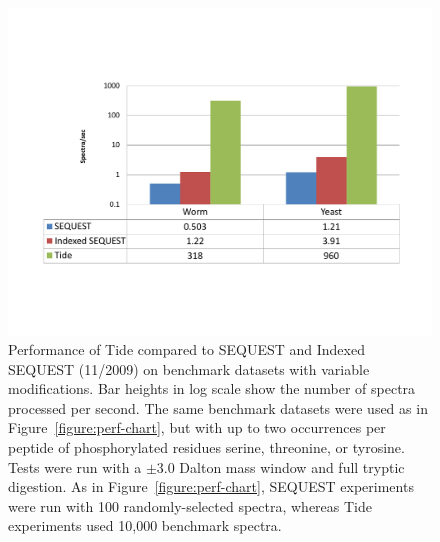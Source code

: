 \begin{figure}
\centering
\includegraphics[width=6.5in]{timing_chart_mods-cropped.pdf}
\caption[Performance of Tide compared to SEQUEST and Indexed SEQUEST on
  benchmark datasets with variable modifications]{Performance of Tide compared
  to SEQUEST and Indexed SEQUEST (11/2009) on benchmark datasets with variable
  modifications. Bar heights in log scale show the number of spectra processed
  per second.  The same benchmark datasets were used as in
  Figure~\ref{figure:perf-chart}, but with up to two occurrences per peptide of
  phosphorylated residues serine, threonine, or tyrosine. Tests were run with a
  $\pm3.0$ Dalton mass window and full tryptic digestion. As in
  Figure~\ref{figure:perf-chart}, SEQUEST experiments were run with 100
  randomly-selected spectra, whereas Tide experiments used 10,000 benchmark
  spectra.
  \label{figure:perf-chart-mods}}
\end{figure}

